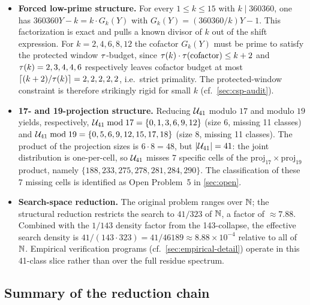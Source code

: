 \begin{itemize}[leftmargin=*]
\item \textbf{Forced low-prime structure.} For every $1 \le k \le 15$
  with $k \mid 360360$, one has $360360 Y - k = k \cdot G_k(Y)$
  with $G_k(Y) = (360360 / k) Y - 1$. This factorization is exact
  and pulls a known divisor of $k$ out of the shift expression. For
  $k = 2, 4, 6, 8, 12$ the cofactor $G_k(Y)$ must be prime to
  satisfy the protected window $\tau$-budget, since $\tau(k) \cdot
  \tau(\text{cofactor}) \le k + 2$ and $\tau(k) = 2, 3, 4, 4, 6$
  respectively leaves cofactor budget at most $\lceil (k+2)/\tau(k)
  \rceil = 2, 2, 2, 2, 2$, i.e.\ strict primality. The
  protected-window constraint is therefore strikingly rigid for
  small $k$ (cf.\ \cref{sec:csp-audit}).

\item \textbf{17- and 19-projection structure.} Reducing $\mathcal{U}_{41}$
  modulo $17$ and modulo $19$ yields, respectively,
  $\mathcal{U}_{41} \bmod 17 = \{0, 1, 3, 6, 9, 12\}$ (size 6, missing 11
  classes) and $\mathcal{U}_{41} \bmod 19 = \{0, 5, 6, 9, 12, 15, 17, 18\}$
  (size 8, missing 11 classes). The product of the projection sizes
  is $6 \cdot 8 = 48$, but $|\mathcal{U}_{41}| = 41$: the joint distribution
  is one-per-cell, so $\mathcal{U}_{41}$ misses 7 specific cells of the
  $\mathrm{proj}_{17} \times \mathrm{proj}_{19}$ product, namely
  $\{188, 233, 275, 278, 281, 284, 290\}$. The classification of
  these 7 missing cells is identified as Open Problem~5 in
  \cref{sec:open}.

\item \textbf{Search-space reduction.} The original problem ranges
  over $\mathbb{N}$; the structural reduction restricts the search to
  $41 / 323$ of $\mathbb{N}$, a factor of $\approx 7.88$. Combined with the
  $1 / 143$ density factor from the 143-collapse, the effective
  search density is $41 / (143 \cdot 323) = 41 / 46189 \approx
  8.88 \times 10^{-4}$ relative to all of $\mathbb{N}$. Empirical
  verification programs (cf.\ \cref{sec:empirical-detail}) operate
  in this 41-class slice rather than over the full residue
  spectrum.
\end{itemize}

\subsection{Summary of the reduction chain}
\label{sec:reduction-summary}

